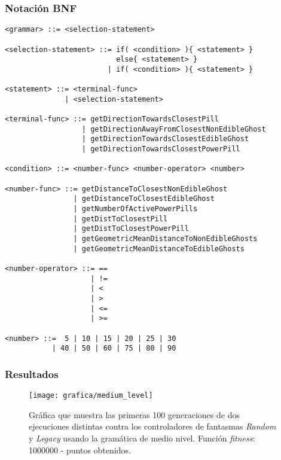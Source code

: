 \subsubsection{Notación BNF}
\begin{lstlisting}[caption={Gramática de medio nivel.}]
<grammar> ::= <selection-statement>

<selection-statement> ::= if( <condition> ){ <statement> }
                          else{ <statement> }
                        | if( <condition> ){ <statement> }

<statement> ::= <terminal-func>
              | <selection-statement>

<terminal-func> ::= getDirectionTowardsClosestPill
                  | getDirectionAwayFromClosestNonEdibleGhost
                  | getDirectionTowardsClosestEdibleGhost
                  | getDirectionTowardsClosestPowerPill
                  
<condition> ::= <number-func> <number-operator> <number>

<number-func> ::= getDistanceToClosestNonEdibleGhost
                | getDistanceToClosestEdibleGhost
                | getNumberOfActivePowerPills
                | getDistToClosestPill
                | getDistToClosestPowerPill
                | getGeometricMeanDistanceToNonEdibleGhosts
                | getGeometricMeanDistanceToEdibleGhosts

<number-operator> ::= ==
                    | !=
                    | <
                    | >
                    | <=
                    | >=

<number> ::=  5 | 10 | 15 | 20 | 25 | 30
           | 40 | 50 | 60 | 75 | 80 | 90
\end{lstlisting}

\subsubsection{Resultados}
\begin{figure}[H]
\centering
\texttt{[image: grafica/medium\_level]}
\caption{Gráfica que muestra las primeras 100 generaciones de dos ejecuciones distintas contra los controladores de fantasmas \textit{Random} y \textit{Legacy} usando la gramática de medio nivel. Función \textit{fitness}: 1000000 - puntos obtenidos.}
\end{figure}

